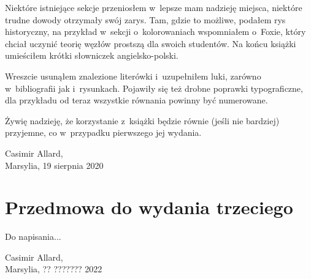 Niektóre istniejące sekcje przeniosłem w~lepsze mam nadzieję miejsca, niektóre trudne dowody otrzymały swój zarys.
Tam, gdzie to możliwe, podałem rys historyczny, na przykład w~sekcji o~kolorowaniach wspomniałem o~Foxie, który chciał uczynić teorię węzłów prostszą dla swoich studentów.
Na końcu książki umieściłem krótki słowniczek angielsko-polski.

Wreszcie usunąłem znalezione literówki i~uzupełniłem luki, zarówno w~bibliografii jak i~rysunkach.
Pojawiły się też drobne poprawki typograficzne, dla przykładu od teraz wszystkie równania powinny być numerowane.

Żywię nadzieję, że korzystanie z~książki będzie równie (jeśli nie bardziej) przyjemne, co w~przypadku pierwszego jej wydania.

\begin{flushright}
Casimir Allard,\\Marsylia, 19 sierpnia 2020
\end{flushright}

\section*{Przedmowa do wydania trzeciego}
Do napisania...

\begin{flushright}
Casimir Allard,\\Marsylia, ?? ??????? 2022
\end{flushright}

\tableofcontents